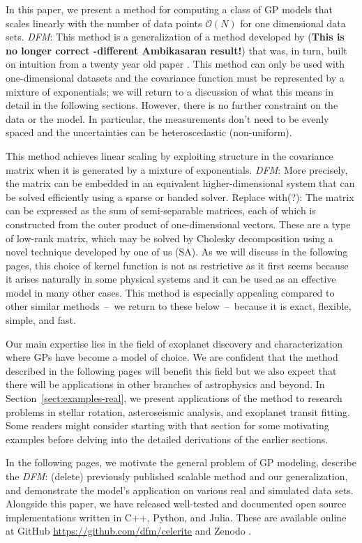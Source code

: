 \documentclass[manuscript, letterpaper]{aastex6}
\newcommand{\project}[1]{\textsf{#1}}
\newcommand{\sectionname}{Section}
\newcommand{\sectref}[1]{\ref{sect:#1}}
\newcommand{\Sect}[1]{\sectionname~\sectref{#1}}
\newcommand{\sect}[1]{\Sect{#1}}
\newcommand{\todo}[3]{{\color{#2}\emph{#1}: #3}}
\newcommand{\dfmtodo}[1]{\todo{DFM}{red}{#1}}
\begin{document}
In this paper, we present a method for computing a class of GP models that
scales linearly with the number of data points $\mathcal{O}(N)$ for one
dimensional data sets.
\dfmtodo{This method is a generalization of a method developed by
\citet{Ambikasaran:2015}
 ({\bf This is no longer correct -different Ambikasaran result!})}
that was, in turn, built on intuition from a twenty
year old paper \citep{Rybicki:1995}.
This method can only be used with one-dimensional datasets and the covariance
function must be represented by a mixture of exponentials; we will return to a
discussion of what this means in detail in the following sections.
However, there is no further constraint on the data or the model.
In particular, the measurements don't need to be evenly spaced and the
uncertainties can be heteroscedastic (non-uniform).

This method achieves linear scaling by exploiting structure in the covariance
matrix when it is generated by a mixture of exponentials.
\dfmtodo{More precisely, the matrix can be embedded in an equivalent higher-dimensional
system that can be solved efficiently using a sparse or banded solver. Replace
with(?): The matrix can be expressed as the sum of semi-separable matrices, each
of which is constructed from the outer product of one-dimensional vectors.  These
are a type of low-rank matrix, which may be solved by Cholesky decomposition
using a novel technique developed by one of us (SA).}
As we will discuss in the following pages, this choice of kernel function is
not as restrictive as it first seems because it arises naturally in some
physical systems and it can be used as an effective model in many other cases.
This method is especially appealing compared to other similar methods~--~we
return to these below~--~because it is exact, flexible, simple, and fast.

Our main expertise lies in the field of exoplanet discovery and
characterization where GPs have become a model of choice.
We are confident that the method described in the following pages will benefit
this field but we also expect that there will be applications in other
branches of astrophysics and beyond.
In \sect{examples-real}, we present applications of the method to research
problems in stellar rotation, asteroseismic analysis, and exoplanet transit
fitting.
Some readers might consider starting with that section for some motivating
examples before delving into the detailed derivations of the earlier sections.

In the following pages, we motivate the general problem of GP modeling,
describe the \dfmtodo{(delete) previously published} scalable method
\citep{Rybicki:1995, Ambikasaran:2015} and our generalization, and demonstrate
the model's application on various real and simulated data sets.
Alongside this paper, we have released well-tested and documented open source
implementations written in \project{C++}, \project{Python}, and
\project{Julia}.
These are available online at \project{GitHub}
\url{https://github.com/dfm/celerite} and \project{Zenodo}
\citep{Foreman-Mackey:2017}.
\end{document}
